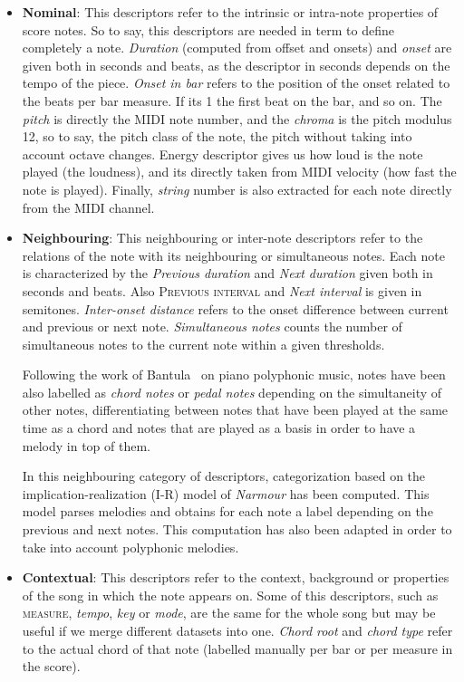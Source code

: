 \begin{itemize}
\item \textbf{Nominal}: This descriptors refer to the intrinsic or intra-note properties of score notes. So to say, this descriptors are needed in term to define completely a note. \textit{Duration} (computed from offset and onsets) and \textit{onset} are given both in seconds and beats, as the descriptor in seconds depends on the tempo of the piece. \textit{Onset in bar} refers to the position of the onset related to the beats per bar measure. If its 1 the first beat on the bar, and so on. The \textit{pitch} is directly the MIDI note number, and the \textit{chroma} is the pitch modulus 12, so to say, the pitch class of the note, the pitch without taking into account octave changes. Energy descriptor gives us how loud is the note played (the loudness), and its directly taken from MIDI velocity (how fast the note is played). Finally, \textit{string} number is also extracted for each note directly from the MIDI channel.

\item \textbf{Neighbouring}: This neighbouring or inter-note descriptors refer to the relations of the note with its neighbouring or simultaneous notes. Each note is characterized by the \textit{Previous duration} and \textit{Next duration} given both in seconds and beats. Also \textsc{Previous interval} and \textit{Next interval} is given in semitones. \textit{Inter-onset distance} refers to the onset difference between current and previous or next note. \textit{Simultaneous notes} counts the number of simultaneous notes to the current note within a given thresholds.

Following the work of Bantula~\cite{bantula2016} on piano polyphonic music, notes have been also labelled as \textit{chord notes} or \textit{pedal notes} depending on the simultaneity of other notes, differentiating between notes that have been played at the same time as a chord and notes that are played as a basis in order to have a melody in top of them.

In this neighbouring category of descriptors, categorization based on the implication-realization (I-R) model of \textit{Narmour} has been computed.  This model parses melodies and obtains for each note a label depending on the previous and next notes. This computation has also been adapted in order to take into account polyphonic melodies. 

\item \textbf{Contextual}: This descriptors refer to the context, background or properties of the song in which the note appears on. Some of this descriptors, such as \textsc{measure}, \textit{tempo}, \textit{key} or \textit{mode}, are the same for the whole song but may be useful if we merge different datasets into one. \textit{Chord root} and \textit{chord type} refer to the actual chord of that note (labelled manually per bar or per measure in the score).


\end{itemize}
